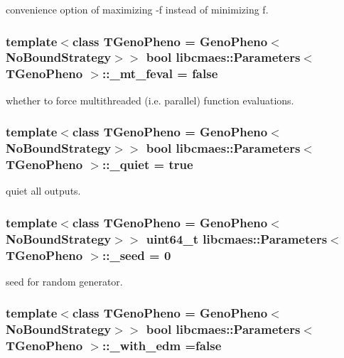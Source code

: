 convenience option of maximizing -\/f instead of minimizing f. \hypertarget{classlibcmaes_1_1Parameters_a78a3b97b4119776b661c1be4fc283069}{
\subsubsection[{\-\_\-mt\-\_\-feval}]{\setlength{\rightskip}{0pt plus 5cm}template$<$class T\-Geno\-Pheno = Geno\-Pheno$<$\-No\-Bound\-Strategy$>$$>$ bool {\bf libcmaes\-::\-Parameters}$<$ T\-Geno\-Pheno $>$\-::\-\_\-mt\-\_\-feval = false\hspace{0.3cm}{\ttfamily [protected]}}}\label{classlibcmaes_1_1Parameters_a78a3b97b4119776b661c1be4fc283069}
whether to force multithreaded (i.\-e. parallel) function evaluations. \hypertarget{classlibcmaes_1_1Parameters_a6f6dad55c02a23891e3280cad288295a}{
\subsubsection[{\-\_\-quiet}]{\setlength{\rightskip}{0pt plus 5cm}template$<$class T\-Geno\-Pheno = Geno\-Pheno$<$\-No\-Bound\-Strategy$>$$>$ bool {\bf libcmaes\-::\-Parameters}$<$ T\-Geno\-Pheno $>$\-::\-\_\-quiet = true\hspace{0.3cm}{\ttfamily [protected]}}}\label{classlibcmaes_1_1Parameters_a6f6dad55c02a23891e3280cad288295a}
quiet all outputs. \hypertarget{classlibcmaes_1_1Parameters_ac6d616c3d5295fec8a0b230592fb767a}{
\subsubsection[{\-\_\-seed}]{\setlength{\rightskip}{0pt plus 5cm}template$<$class T\-Geno\-Pheno = Geno\-Pheno$<$\-No\-Bound\-Strategy$>$$>$ uint64\-\_\-t {\bf libcmaes\-::\-Parameters}$<$ T\-Geno\-Pheno $>$\-::\-\_\-seed = 0\hspace{0.3cm}{\ttfamily [protected]}}}\label{classlibcmaes_1_1Parameters_ac6d616c3d5295fec8a0b230592fb767a}
seed for random generator. \hypertarget{classlibcmaes_1_1Parameters_adbaa11317ae66061e097c372522b8758}{
\subsubsection[{\-\_\-with\-\_\-edm}]{\setlength{\rightskip}{0pt plus 5cm}template$<$class T\-Geno\-Pheno = Geno\-Pheno$<$\-No\-Bound\-Strategy$>$$>$ bool {\bf libcmaes\-::\-Parameters}$<$ T\-Geno\-Pheno $>$\-::\-\_\-with\-\_\-edm =false\hspace{0.3cm}{\ttfamily [protected]}}}\label{classlibcmaes_1_1Parameters_adbaa11317ae66061e097c372522b8758}
